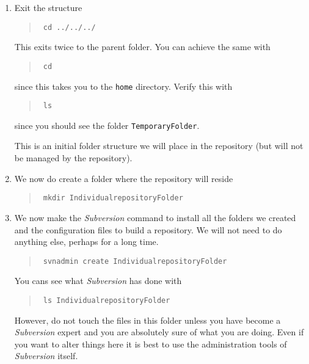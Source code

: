 \documentclass[article,12pt]{article}
\begin{document}
\begin{enumerate}
We now make a folder to hold \Cpp\/ files or other files
to build or software.
\begin{quote}
{\tt
mkdir ProjectPackMan.d
}
\end{quote}

Now navigate inside this recently created folder.
\begin{quote}
{\tt
cd ProjectPackMan.d
}
\end{quote}

Using an editor, for example in
POSIX, we can use {\tt vi}
and construct some code.
 Open the file
{\tt hello.cpp} 
and place in the following content.\\



\item Exit the structure
\begin{quote}
{\tt
cd ../../../
}
\end{quote}
This exits twice to the parent folder. You can achieve the same with
\begin{quote}
{\tt
cd 
}
\end{quote}
since this takes you to the {\tt home} directory.
Verify this with
\begin{quote}
{\tt
ls
}
\end{quote}
since you should see the folder  {\tt TemporaryFolder}.

This is an initial folder structure we will place in the repository (but will
not be managed by the repository).


\item We now do create a folder where the repository will reside
\begin{quote}
{\tt
mkdir IndividualrepositoryFolder
}
\end{quote}

\item We now make the {\em Subversion} command to install all the folders
we created and the configuration files to build a repository.
We will not need to do anything else, perhaps for a long time.

\begin{quote}
{\tt
svnadmin create IndividualrepositoryFolder
}
\end{quote}

You cans see what {\em Subversion} has done with
\begin{quote}
{\tt
ls IndividualrepositoryFolder
}
\end{quote}
However, do not touch the files in this folder unless you have become
a {\em Subversion} expert and you are absolutely sure of what you are doing.
Even if you want to alter things here it is best to use the 
administration tools of
 {\em Subversion} itself.


\end{enumerate}
\end{document}
